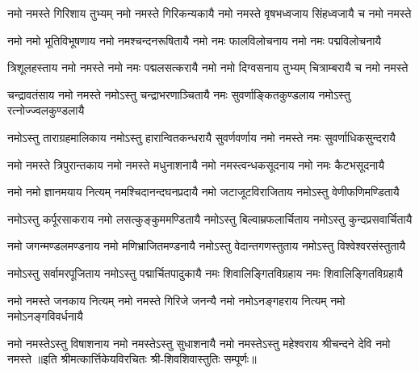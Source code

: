 
\fourlineindentedshloka
{नमो नमस्ते गिरिशाय तुभ्यम्}
{नमो नमस्ते गिरिकन्यकायै}
{नमो नमस्ते वृषभध्वजाय}
{सिंहध्वजायै च नमो नमस्ते}

\fourlineindentedshloka
{नमो नमो भूतिविभूषणाय}
{नमो नमश्चन्दनरूषितायै}
{नमो नमः फालविलोचनाय}
{नमो नमः पद्मविलोचनायै}

\fourlineindentedshloka
{त्रिशूलहस्ताय नमो नमस्ते}
{नमो नमः पद्मलसत्करायै}
{नमो नमो दिग्वसनाय तुभ्यम्}
{चित्राम्बरायै च नमो नमस्ते}

\fourlineindentedshloka
{चन्द्रावतंसाय नमो नमस्ते}
{नमोऽस्तु चन्द्राभरणाञ्चितायै}
{नमः सुवर्णाङ्कितकुण्डलाय}
{नमोऽस्तु रत्नोज्ज्वलकुण्डलायै}

\fourlineindentedshloka
{नमोऽस्तु ताराग्रहमालिकाय}
{नमोऽस्तु हारान्वितकन्धरायै}
{सुवर्णवर्णाय नमो नमस्ते}
{नमः सुवर्णाधिकसुन्दरायै}

\fourlineindentedshloka
{नमो नमस्ते त्रिपुरान्तकाय}
{नमो नमस्ते मधुनाशनायै}
{नमो नमस्त्वन्धकसूदनाय}
{नमो नमः कैटभसूदनायै}

\fourlineindentedshloka
{नमो नमो ज्ञानमयाय नित्यम्}
{नमश्चिदानन्दघनप्रदायै}
{नमो जटाजूटविराजिताय}
{नमोऽस्तु वेणीफणिमण्डितायै}

\fourlineindentedshloka
{नमोऽस्तु कर्पूरसाकराय}
{नमो लसत्कुङ्कुममण्डितायै}
{नमोऽस्तु बिल्वाम्रफलार्चिताय}
{नमोऽस्तु कुन्दप्रसवार्चितायै}

\fourlineindentedshloka
{नमो जगन्मण्डलमण्डनाय}
{नमो मणिभ्राजितमण्डनायै}
{नमोऽस्तु वेदान्तगणस्तुताय}
{नमोऽस्तु विश्वेश्वरसंस्तुतायै}

\fourlineindentedshloka
{नमोऽस्तु सर्वामरपूजिताय}
{नमोऽस्तु पद्मार्चितपादुकायै}
{नमः शिवालिङ्गितविग्रहाय}
{नमः शिवालिङ्गितविग्रहायै}

\fourlineindentedshloka
{नमो नमस्ते जनकाय नित्यम्}
{नमो नमस्ते गिरिजे जनन्यै}
{नमो नमोऽनङ्गहराय नित्यम्}
{नमो नमोऽनङ्गविवर्धनायै}

\fourlineindentedshloka
{नमो नमस्तेऽस्तु विषाशनाय}
{नमो नमस्तेऽस्तु सुधाशनायै}
{नमो नमस्तेऽस्तु महेश्वराय}
{श्रीचन्दने देवि नमो नमस्ते}
॥इति श्रीमत्कार्त्तिकेयविरचितः श्री-शिवशिवास्तुतिः सम्पूर्णः॥
